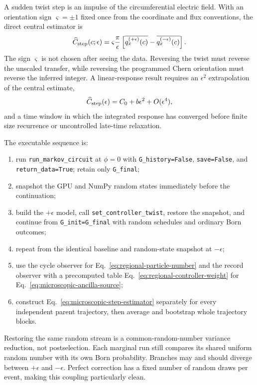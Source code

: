 \documentclass[aps,prb,onecolumn,nofootinbib,superscriptaddress]{revtex4-2}
\newcommand{\code}[1]{\texttt{#1}}
\begin{document}
A sudden twist step is an impulse of the circumferential electric field.  With
an orientation sign $\varsigma=\pm1$ fixed once from the coordinate and flux
conventions, the direct central estimator is
\begin{equation}
  \widehat C_{\rm step}(c;\epsilon)
  =\varsigma\frac{\pi}{\epsilon}
  \left[
    \overline{q_x^{(+\epsilon)}(c)}
    -\overline{q_x^{(-\epsilon)}(c)}
  \right].
  \label{eq:microscopic-step-estimator}
\end{equation}
The sign $\varsigma$ is not chosen after seeing the data.  Reversing the twist
must reverse the unscaled transfer, while reversing the programmed Chern
orientation must reverse the inferred integer.  A linear-response result
requires an $\epsilon^2$ extrapolation of the central estimate,
\begin{equation}
  \widehat C_{\rm step}(\epsilon)
  =C_0+b\epsilon^2+O(\epsilon^4),
  \label{eq:step-extrapolation}
\end{equation}
and a time window in which the integrated response has converged before finite
size recurrence or uncontrolled late-time relaxation.

The executable sequence is:
\begin{enumerate}
  \item run \code{run\_markov\_circuit} at $\phi=0$ with
  \code{G\_history=False}, \code{save=False}, and
  \code{return\_data=True}; retain only \code{G\_final};
  \item snapshot the GPU and NumPy random states immediately before the
  continuation;
  \item build the $+\epsilon$ model, call
  \code{set\_controller\_twist}, restore the snapshot, and continue from
  \code{G\_init=G\_final} with random schedules and ordinary Born outcomes;
  \item repeat from the identical baseline and random-state snapshot at
  $-\epsilon$;
  \item use the cycle observer for Eq.~\eqref{eq:regional-particle-number} and
  the record observer with a precomputed table
  Eq.~\eqref{eq:regional-controller-weight} for
  Eq.~\eqref{eq:microscopic-ancilla-source};
  \item construct Eq.~\eqref{eq:microscopic-step-estimator} separately for
  every independent parent trajectory, then average and bootstrap whole
  trajectory blocks.
\end{enumerate}
Restoring the same random stream is a common-random-number variance reduction,
not postselection.  Each marginal run still compares its shared uniform random
number with its own Born probability.  Branches may and should diverge between
$+\epsilon$ and $-\epsilon$.  Perfect correction has a fixed number of random
draws per event, making this coupling particularly clean.
\end{document}
